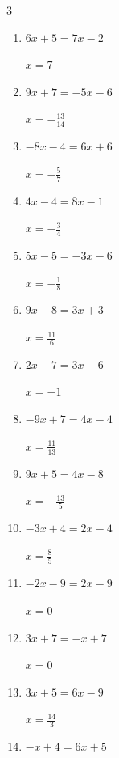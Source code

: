 \begin{multicols}{3}
\begin{enumerate}
        $\displaystyle x=-\frac{14}{3}$

  \item $6x+5=7x-2$

        $\displaystyle x=7$

  \item $9x+7=-5x-6$

        $\displaystyle x=-\frac{13}{14}$

  \item $-8x-4=6x+6$

        $\displaystyle x=-\frac{5}{7}$

\columnbreak %

\resetques

  \item $4x-4=8x-1$

        $\displaystyle x=-\frac{3}{4}$

  \item $5x-5=-3x-6$

        $\displaystyle x=-\frac{1}{8}$

  \item $9x-8=3x+3$

        $\displaystyle x=\frac{11}{6}$

  \item $2x-7=3x-6$

        $\displaystyle x=-1$

  \item $-9x+7=4x-4$

        $\displaystyle x=\frac{11}{13}$

  \item $9x+5=4x-8$

        $\displaystyle x=-\frac{13}{5}$

  \item $-3x+4=2x-4$

        $\displaystyle x=\frac{8}{5}$

  \item $-2x-9=2x-9$

        $\displaystyle x=0$

  \item $3x+7=-x+7$

        $\displaystyle x=0$

  \item $3x+5=6x-9$

        $\displaystyle x=\frac{14}{3}$

  \item $-x+4=6x+5$


\end{enumerate}
\end{multicols}

